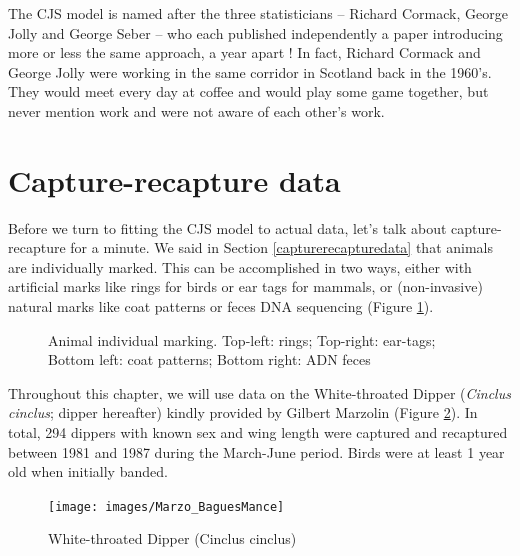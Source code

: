 \documentclass[
  12pt,
]{krantz}
\begin{document}
The CJS model is named after the three statisticians -- Richard Cormack, George Jolly and George Seber -- who each published independently a paper introducing more or less the same approach, a year apart ! In fact, Richard Cormack and George Jolly were working in the same corridor in Scotland back in the 1960's. They would meet every day at coffee and would play some game together, but never mention work and were not aware of each other's work.

\hypertarget{capture-recapture-data}{%
\section{Capture-recapture data}\label{capture-recapture-data}}

Before we turn to fitting the CJS model to actual data, let's talk about capture-recapture for a minute. We said in Section \ref{capturerecapturedata} that animals are individually marked. This can be accomplished in two ways, either with artificial marks like rings for birds or ear tags for mammals, or (non-invasive) natural marks like coat patterns or feces DNA sequencing (Figure \ref{fig:marking}).

\begin{figure}
\newline{}\caption{Animal individual marking. Top-left: rings; Top-right: ear-tags; Bottom left: coat patterns; Bottom right: ADN feces}\label{fig:marking}
\end{figure}

Throughout this chapter, we will use data on the White-throated Dipper (\emph{Cinclus cinclus}; dipper hereafter) kindly provided by Gilbert Marzolin (Figure \ref{fig:pixdipper}). In total, 294 dippers with known sex and wing length were captured and recaptured between 1981 and 1987 during the March-June period. Birds were at least 1 year old when initially banded.

\begin{figure}

{\centering \texttt{[image: images/Marzo\_BaguesMance]} 

}

\caption{White-throated Dipper (Cinclus cinclus)}\label{fig:pixdipper}
\end{figure}
\end{document}
